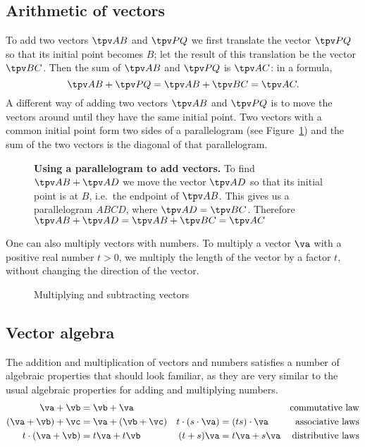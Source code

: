 \subsection{Arithmetic of vectors} %
\label{sec:arithmetic-of-vectors}
To add two vectors $\tpv AB$ and $\tpv PQ$ we first translate the vector $\tpv PQ$ so
that its initial point becomes $B$; let the result of this translation be the vector
$\tpv BC$.  Then the sum of $\tpv AB$ and $\tpv PQ$ is $\tpv AC$: in a formula,
\[
\tpv AB + \tpv PQ = \tpv AB + \tpv BC = \tpv AC.
\]
A different way of adding two vectors $\tpv AB$ and $\tpv PQ$ is to move the vectors
around until they have the same initial point.  Two vectors with a common initial
point form two sides of a parallelogram (see
Figure~\ref{fig:adding-vectors-parallelogram}) and the sum of the two vectors is the
diagonal of that parallelogram.
\begin{figure}[h]
  
  \caption{{\bfseries Using a parallelogram to add vectors. }
  To find $\tpv AB  + \tpv AD$ we move the vector $\tpv AD$ so that its initial point
  is at $B$, i.e.~the endpoint of $\tpv AB$.  This gives us a 
  parallelogram $ABCD$, where $\tpv AD = \tpv BC$.  Therefore $\tpv AB+\tpv AD = \tpv
  AB+\tpv BC = \tpv AC$ }
  \label{fig:adding-vectors-parallelogram}
\end{figure}

One can also multiply vectors with numbers.  To multiply a vector $\va$ with a
positive real number $t>0$, we multiply the length of the vector by a factor $t$,
without changing the direction of the vector.
\begin{figure}[h]
  
  \caption{Multiplying and subtracting vectors}
\end{figure}
\subsection{Vector algebra} %
The addition and multiplication of vectors and numbers satisfies a number of
algebraic properties that should look familiar, as they are very similar to the usual
algebraic properties for adding and multiplying numbers.
\begin{align*}
  \va+\vb&=\vb+\va &&& \text{commutative law}\\
  (\va+\vb)+\vc &= \va+(\vb+\vc) & t\cdot(s\cdot\va) &= (ts)\cdot \va
  &\text{associative laws}\\
  t\cdot(\va+\vb) & = t\va+t\vb & (t+s)\va &= t\va + s\va
  &\text{distributive laws}
\end{align*}
